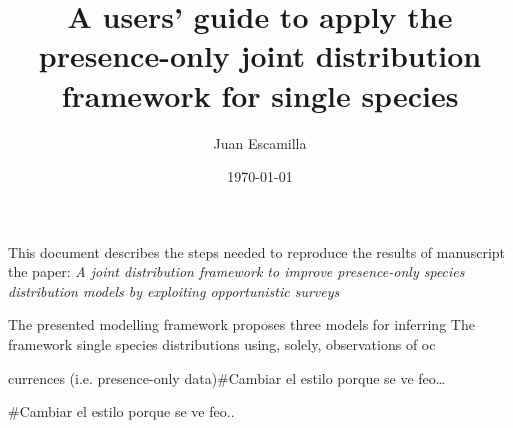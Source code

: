 \documentclass[11pt]{article}
\author{Juan Escamilla}
\date{\today}
\title{A users' guide to apply the presence-only joint distribution framework for single species}
\begin{document}
\maketitle
\tableofcontents

This document describes the steps needed to reproduce the results of manuscript the paper: \emph{A joint distribution framework to improve presence-only species distribution models by exploiting opportunistic surveys} \cite{EscamillaMolgora2020c}

The presented modelling framework proposes three models for inferring
The framework single species distributions using, solely, observations of oc


currences (i.e. presence-only data)\#Cambiar el estilo porque se ve feo\ldots{}



\#Cambiar el estilo porque se ve feo..


\end{document}
